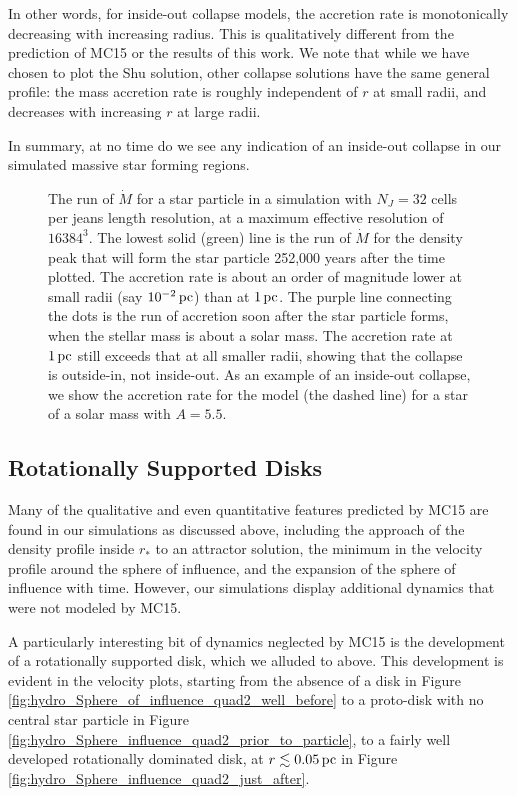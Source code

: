 \documentclass[../dissertation.tex]{subfiles}
\begin{document}
In other words, for inside-out collapse models, the accretion rate is monotonically decreasing with increasing radius. This is qualitatively different from the prediction of MC15 or the results of this work. We note that while we have chosen to plot the Shu solution, other collapse solutions \citep{1997ApJ...476..750M,2002Natur.416...59M,2003ApJ...585..850M} have the same general profile: the mass accretion rate is roughly independent of $r$ at small radii, and decreases with increasing $r$ at large radii.  

In summary, at no time do we see any indication of an inside-out collapse in our simulated massive star forming regions.   

%
\begin{figure}[htb]
\caption[Hydro Run of Mass Accretion Rate]{\label{fig:hydro_Mdot_vs_shu}}The run of $\dot{M}$ for a star particle in a simulation with $N_J=32$ cells per jeans length resolution, at a maximum effective resolution of $16384^3$. The lowest solid (green) line is the run of $\dot{M}$  for the density peak that will form the star particle 252,000 years after the time plotted. The accretion rate is about an order of magnitude lower at small radii (say $10^{-2}\,\rm pc$) than at $1\,\rm pc$. The purple line connecting the dots is the run of accretion soon after the star particle forms, when the stellar mass is about a solar mass. The accretion rate at $1\,\rm pc$ still exceeds that at all smaller radii, showing that the collapse is outside-in, not inside-out. As an example of an inside-out collapse, we show the accretion rate for the \citet{1977ApJ...214..488S} model (the dashed line) for a star of a solar mass with $A = 5.5$. 
\end{figure}
%


\subsection{Rotationally Supported Disks}
\label{sec:hydro_Rotationally_supported_disks}
Many of the qualitative and even quantitative features predicted by MC15 are 
found in our simulations as discussed above, including the approach of the 
density profile inside $r_*$ to an attractor 
solution, the minimum in the velocity profile around the sphere of influence, 
and the expansion of the sphere of influence with time.
However, our simulations display additional dynamics that were not modeled by MC15.  

A particularly interesting bit of dynamics neglected by MC15 is the 
development of a rotationally supported disk, which we alluded to above.
This development is evident in the velocity plots, starting from the absence of a disk in 
Figure \ref{fig:hydro_Sphere_of_influence_quad2_well_before} to a proto-disk 
with no central star particle in Figure 
\ref{fig:hydro_Sphere_influence_quad2_prior_to_particle}, to a fairly well 
developed rotationally dominated disk, at $r \lesssim 0.05 \,\rm pc$ in 
Figure \ref{fig:hydro_Sphere_influence_quad2_just_after}. 
\end{document}
